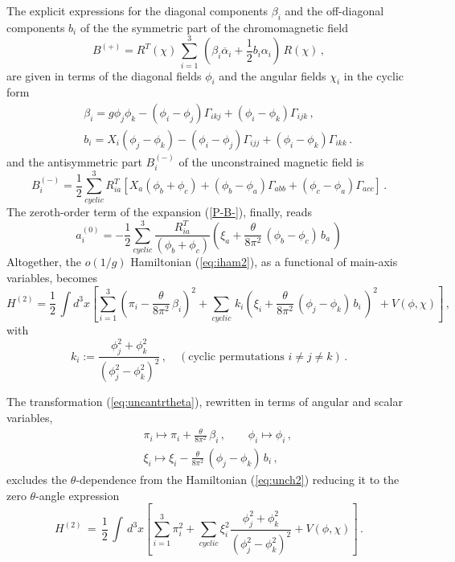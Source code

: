 \documentclass[a4paper,12pt]{article}
\newcommand{\nn}{\nonumber}
\begin{document}
The explicit expressions for the diagonal components $\beta_i$ and
the off-diagonal components $b_i$ of the
the symmetric part of the chromomagnetic field
\begin{equation}
\label{B+}
B^{(+)} = R^T(\chi)\,
 \sum_{i=1}^3\,\left( \beta_i\overline{\alpha}_i  +
\frac{1}{2}b_i\alpha_i \right)\, R(\chi)\,,
\end{equation}
are given in terms of the diagonal fields $\phi_i$ and
the angular fields $\chi_i$ in the cyclic form
\begin{eqnarray}
&&
\beta_i =
g\phi_j\phi_k - (\phi_i-\phi_j)\Gamma_{ikj} +
(\phi_i-\phi_k)\Gamma_{ijk}\,,\\
&&
b_i=
X_i(\phi_j-\phi_k)-(\phi_i-\phi_j)\Gamma_{ijj} +
(\phi_i-\phi_k)\Gamma_{ikk} \,.
\label{b_i}
\end{eqnarray}
and the antisymmetric part $B^{(-)}_i$ of the unconstrained magnetic field is
\begin{equation}
\label{B-}
B^{(-)}_i=\frac{1}{2}\sum_{cyclic}^3 R^T_{ia}\left[X_a(\phi_b+\phi_c)+
(\phi_b-\phi_a)\Gamma_{abb}+(\phi_c-\phi_a)\Gamma_{acc}\right] \,.
\end{equation}
The zeroth-order term of the expansion (\ref{P-B-}), finally, reads
\begin{equation}
\label{P-approx}
a^{(0)}_i =
-\frac{1}{2}\sum_{cyclic}^3 \frac{R^T_{ia}}{(\phi_b + \phi_c)}\left(
\xi_a + \frac{\theta}{8\pi^2}\, (\phi_b - \phi_c)\,b_{a}
\,\right)
\end{equation}
Altogether, the $o(1/g)$ Hamiltonian (\ref{eq:iham2}), as a functional
of main-axis variables, becomes
\begin{equation}
\label{eq:unch2}
H^{(2)}  =
\frac{1}{2}\, \int d^3x
\left[
\sum_{i=1}^3
\left(\pi_i - \frac{\theta}{8\pi^2}\, {\beta}_i\right)^2  +
\sum_{cyclic}\, k_i \left(
\xi_i + \frac{\theta}{8\pi^2}\,(\phi_j - \phi_k)\,b_{i}\,\right)^2
+  V(\phi,\chi)
\right]\,,
\end{equation}
with
\begin{equation} \label{eq:km}
k_i := \frac{\phi_j^2 + \phi_k^2}{(\phi_j^2 - \phi_k^2)^2} \,, \quad
(\mbox{cyclic permutations}\,\,  i\not = j\not = k )\,.
\end{equation}

The transformation (\ref{eq:uncantrtheta}), rewritten
in terms of angular and scalar variables,
\begin{eqnarray}
\label{eq:crt}
&&
\pi_i \longmapsto \pi_i + \frac{\theta}{8\pi^2}\,\beta_i \,, \qquad
\phi_i \longmapsto \phi_i \,, \nn\\
&&
\xi_i \longmapsto \xi_i - \frac{\theta}{8\pi^2}\,(\phi_j - \phi_k)\,b_i \,,
\end{eqnarray}
excludes the $\theta$-dependence from the Hamiltonian (\ref{eq:unch2})
reducing it to the zero $\theta$-angle expression \cite{KP}
\begin{equation}
\label{eq:uncz}
H^{(2)} \, = \,
\frac{1}{2}\, \int\, d^3x
\left[
\sum_{i=1}^3 \pi_i^2  +
\sum_{cyclic}\xi_i^2\frac{\phi_j^2+\phi_k^2}{(\phi_j^2-\phi_k^2)^2}
+V(\phi, \chi)
\right]\,.
\end{equation}
\end{document}
